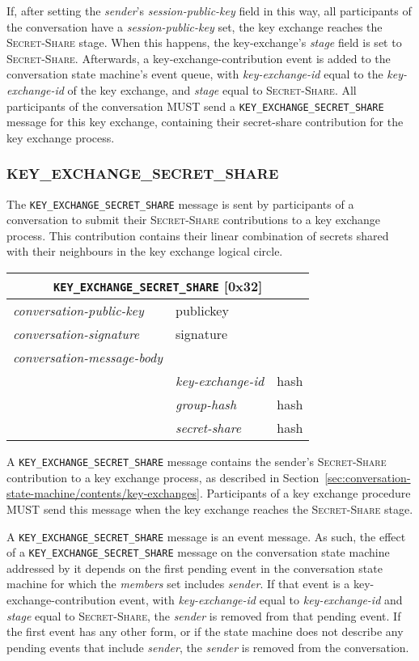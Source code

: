 \documentclass{article}
\def\npmessage#1{\texttt{#1}}
\def\field#1{\textit{#1}}
\def\smfield#1{\textsl{#1}}
\def\type#1{\textsf{#1}}
\newenvironment{conversationmessage}[2]{
\newcommand{\messagefield}[2]{
& \field{##1} & \type{##2} \\
\hline
}
\hspace{2em minus 2em}\begin{tabular}{|l|l|l|}
\hline
\multicolumn{3}{|c|}{\npmessage{#1} [#2]} \\
\hline
\hline
\field{conversation-public-key} & \multicolumn{2}{l|}{\type{publickey}} \\
\hline
\field{conversation-signature} & \multicolumn{2}{l|}{\type{signature}} \\
\hline
\field{conversation-message-body} & \multicolumn{2}{l|}{} \\
\hline
}{
\end{tabular}
}
\begin{document}
If, after setting the \field{sender}'s \smfield{session-public-key} field in this way, all participants of the conversation have a \smfield{session-public-key} set, the key exchange reaches the \textsc{Secret-Share} stage.
When this happens, the \type{key-exchange}'s \smfield{stage} field is set to \textsc{Secret-Share}.
Afterwards, a \type{key-exchange-contribution} event is added to the conversation state machine's event queue, with \smfield{key-exchange-id} equal to the \smfield{key-exchange-id} of the key exchange, and \smfield{stage} equal to \textsc{Secret-Share}.
All participants of the conversation MUST send a \npmessage{KEY\_EXCHANGE\_SECRET\_SHARE} message for this key exchange, containing their secret-share contribution for the key exchange process.


\subsubsection{KEY\_EXCHANGE\_SECRET\_SHARE}
\label{sec:messages/key-exchange-secret-share}

The \npmessage{KEY\_EXCHANGE\_SECRET\_SHARE} message is sent by participants of a conversation to submit their \textsc{Secret-Share} contributions to a key exchange process.
This contribution contains their linear combination of secrets shared with their neighbours in the key exchange logical circle.

\begin{conversationmessage}{KEY\_EXCHANGE\_SECRET\_SHARE}{0x32}
\messagefield{key-exchange-id}{hash}
\messagefield{group-hash}{hash}
\messagefield{secret-share}{hash}
\end{conversationmessage}

A \npmessage{KEY\_EXCHANGE\_SECRET\_SHARE} message contains the sender's \textsc{Secret-Share} contribution to a key exchange process, as described in Section~\ref{sec:conversation-state-machine/contents/key-exchanges}.
Participants of a key exchange procedure MUST send this message when the key exchange reaches the \textsc{Secret-Share} stage.

A \npmessage{KEY\_EXCHANGE\_SECRET\_SHARE} message is an event message.
As such, the effect of a \npmessage{KEY\_EXCHANGE\_SECRET\_SHARE} message on the conversation state machine addressed by it depends on the first pending event in the conversation state machine for which the \smfield{members} set includes \field{sender}.
If that event is a \type{key-exchange-contribution} event, with \smfield{key-exchange-id} equal to \field{key-exchange-id} and \smfield{stage} equal to \textsc{Secret-Share}, the \field{sender} is removed from that pending event.
If the first event has any other form, or if the state machine does not describe any pending events that include \field{sender}, the \field{sender} is removed from the conversation.
\end{document}
